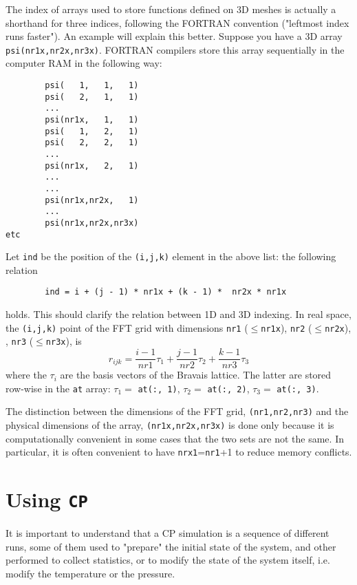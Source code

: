 \documentclass[12pt,a4paper]{article}
\def\CP{\texttt{CP}}
\begin{document}
The index of arrays used to store functions defined on 3D meshes is
actually a shorthand for three indices, following the FORTRAN convention 
("leftmost index runs faster"). An example will explain this better. 
Suppose you have a 3D array \texttt{psi(nr1x,nr2x,nr3x)}. FORTRAN 
compilers store this array sequentially  in the computer RAM in the following way:
\begin{verbatim}
        psi(   1,   1,   1)
        psi(   2,   1,   1)
        ...
        psi(nr1x,   1,   1)
        psi(   1,   2,   1)
        psi(   2,   2,   1)
        ...
        psi(nr1x,   2,   1)
        ...
        ...
        psi(nr1x,nr2x,   1)
        ...
        psi(nr1x,nr2x,nr3x)
etc
\end{verbatim}
Let \texttt{ind} be the position of the \texttt{(i,j,k)} element in the above list: 
the following relation
\begin{verbatim}
        ind = i + (j - 1) * nr1x + (k - 1) *  nr2x * nr1x
\end{verbatim}
holds. This should clarify the relation between 1D and 3D indexing. In real
space, the \texttt{(i,j,k)} point of the FFT grid with dimensions 
\texttt{nr1} ($\le$\texttt{nr1x}), 
\texttt{nr2}  ($\le$\texttt{nr2x}), , \texttt{nr3} ($\le$\texttt{nr3x}), is
$$
r_{ijk}=\frac{i-1}{nr1} \tau_1  +  \frac{j-1}{nr2} \tau_2 +
\frac{k-1}{nr3} \tau_3 
$$
where the $\tau_i$ are the basis vectors of the Bravais lattice. 
The latter are stored row-wise in the \texttt{at} array:
$\tau_1 = $ \texttt{at(:, 1)}, 
$\tau_2 = $ \texttt{at(:, 2)}, 
$\tau_3 = $ \texttt{at(:, 3)}.

The distinction between the dimensions of the FFT grid,
\texttt{(nr1,nr2,nr3)} and the physical dimensions of the array,
\texttt{(nr1x,nr2x,nr3x)} is done only because it is computationally
convenient in some cases that the two sets are not the same.
In particular, it is often convenient to have \texttt{nrx1}=\texttt{nr1}+1
to reduce memory conflicts.

\section{Using \CP}

It is important to understand that a CP simulation is a sequence of different 
runs, some of them used to "prepare" the initial state of the system, and 
other performed to collect statistics, or to modify the state of the system
itself, i.e. modify the temperature or the pressure.
    
\end{document}
